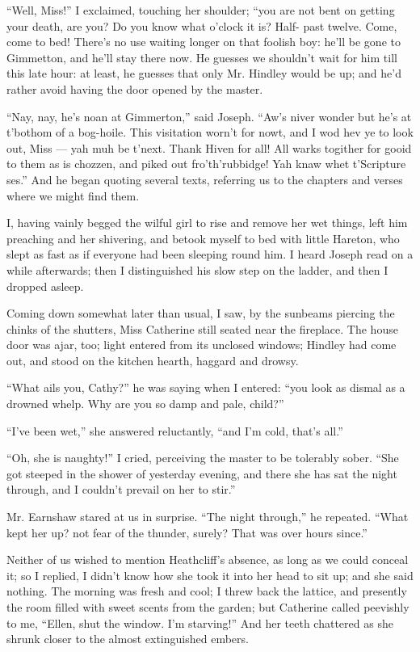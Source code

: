 \par “Well, Miss!” I exclaimed, touching her shoulder; “you are not bent on getting your death, are you? Do you know what o'clock it is? Half- past twelve. Come, come to bed! There's no use waiting longer on that foolish boy: he'll be gone to Gimmetton, and he'll stay there now. He guesses we shouldn't wait for him till this late hour: at least, he guesses that only Mr. Hindley would be up; and he'd rather avoid having the door opened by the master.
\par “Nay, nay, he's noan at Gimmerton,” said Joseph. “Aw's niver wonder but he's at t'bothom of a bog-hoile. This visitation worn't for nowt, and I wod hev ye to look out, Miss — yah muh be t'next. Thank Hiven for all! All warks togither for gooid to them as is chozzen, and piked out fro'th'rubbidge! Yah knaw whet t'Scripture ses.” And he began quoting several texts, referring us to the chapters and verses where we might find them.
\par I, having vainly begged the wilful girl to rise and remove her wet things, left him preaching and her shivering, and betook myself to bed with little Hareton, who slept as fast as if everyone had been sleeping round him. I heard Joseph read on a while afterwards; then I distinguished his slow step on the ladder, and then I dropped asleep.
\par Coming down somewhat later than usual, I saw, by the sunbeams piercing the chinks of the shutters, Miss Catherine still seated near the fireplace. The house door was ajar, too; light entered from its unclosed windows; Hindley had come out, and stood on the kitchen hearth, haggard and drowsy.
\par “What ails you, Cathy?” he was saying when I entered: “you look as dismal as a drowned whelp. Why are you so damp and pale, child?”
\par “I've been wet,” she answered reluctantly, “and I'm cold, that's all.”
\par “Oh, she is naughty!” I cried, perceiving the master to be tolerably sober. “She got steeped in the shower of yesterday evening, and there she has sat the night through, and I couldn't prevail on her to stir.”
\par Mr. Earnshaw stared at us in surprise. “The night through,” he repeated. “What kept her up? not fear of the thunder, surely? That was over hours since.”
\par Neither of us wished to mention Heathcliff's absence, as long as we could conceal it; so I replied, I didn't know how she took it into her head to sit up; and she said nothing. The morning was fresh and cool; I threw back the lattice, and presently the room filled with sweet scents from the garden; but Catherine called peevishly to me, “Ellen, shut the window. I'm starving!” And her teeth chattered as she shrunk closer to the almost extinguished embers.
